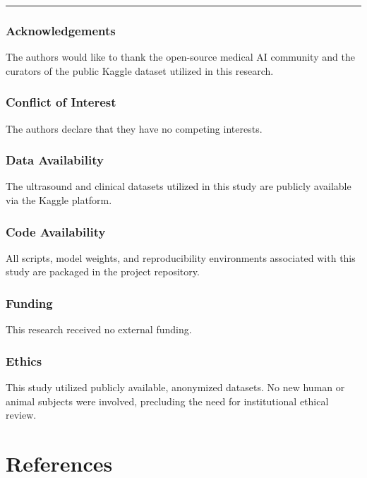 \begin{center}\rule{0.5\linewidth}{0.5pt}\end{center}

\subsubsection{Acknowledgements}\label{acknowledgements}

The authors would like to thank the open-source medical AI community and
the curators of the public Kaggle dataset utilized in this research.

\subsubsection{Conflict of Interest}\label{conflict-of-interest}

The authors declare that they have no competing interests.

\subsubsection{Data Availability}\label{data-availability}

The ultrasound and clinical datasets utilized in this study are publicly
available via the Kaggle platform.

\subsubsection{Code Availability}\label{code-availability}

All scripts, model weights, and reproducibility environments associated
with this study are packaged in the project repository.

\subsubsection{Funding}\label{funding}

This research received no external funding.

\subsubsection{Ethics}\label{ethics}

This study utilized publicly available, anonymized datasets. No new
human or animal subjects were involved, precluding the need for
institutional ethical review.

\section{References}\label{references}


